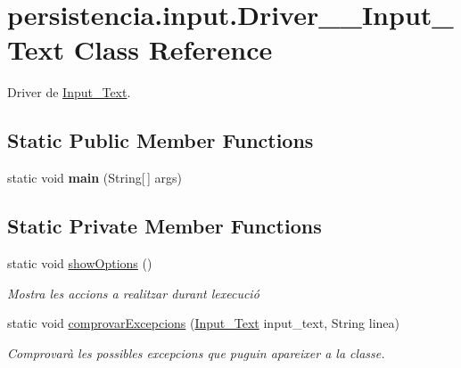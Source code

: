 \hypertarget{classpersistencia_1_1input_1_1Driver____Input__Text}{}\section{persistencia.\+input.\+Driver\+\_\+\+\_\+\+Input\+\_\+\+Text Class Reference}
\label{classpersistencia_1_1input_1_1Driver____Input__Text}


Driver de \hyperlink{classpersistencia_1_1input_1_1Input__Text}{Input\+\_\+\+Text}.  


\subsection*{Static Public Member Functions}
\begin{DoxyCompactItemize}
\item 
\mbox{\label{classpersistencia_1_1input_1_1Driver____Input__Text_abd1883a5cb70c0120dd4d34c7ab0e74f}} 
static void {\bfseries main} (String\mbox{[}$\,$\mbox{]} args)
\end{DoxyCompactItemize}
\subsection*{Static Private Member Functions}
\begin{DoxyCompactItemize}
\item 
\mbox{\label{classpersistencia_1_1input_1_1Driver____Input__Text_a5f6dc69813c8615a8e7780e15d4bf2fc}} 
static void \hyperlink{classpersistencia_1_1input_1_1Driver____Input__Text_a5f6dc69813c8615a8e7780e15d4bf2fc}{show\+Options} ()
\begin{DoxyCompactList}\small\item\em Mostra les accions a realitzar durant l\textquotesingle{}execució \end{DoxyCompactList}\item 
static void \hyperlink{classpersistencia_1_1input_1_1Driver____Input__Text_a8d9bcf9b177d3d13d0d4541eab4916ad}{comprovar\+Excepcions} (\hyperlink{classpersistencia_1_1input_1_1Input__Text}{Input\+\_\+\+Text} input\+\_\+text, String linea)
\begin{DoxyCompactList}\small\item\em Comprovarà les possibles excepcions que puguin apareixer a la classe. \end{DoxyCompactList}\end{DoxyCompactItemize}


